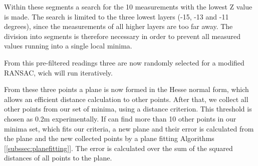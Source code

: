 \documentclass[11pt,oneside,openright]{mpreport}
\begin{document}



Within these segments a search for the 10 measurements with the lowest Z value is made. The search is limited to the three lowest layers (-15, -13 and -11 degrees),
since the measurements of all higher layers are too far away. The division into segments is therefore necessary in order to prevent all measured values running into a single local minima. 


From this pre-filtered readings three are now randomly selected for a modified \ac{RANSAC}, wich will run iteratively.

From these three points a plane is now formed in the Hesse normal form, which allows an efficient distance calculation to other points.
After that, we collect all other points from our set of minima, using a distance criterion. This threshold is chosen as 0.2m experimentally.
If can find more than 10 other points in our minima set, which fits our criteria, a new plane and their error is calculated from the plane and
the new collected points by a plane fitting Algorithms [\cref{subssec:planefitting}].
The error is calculated over the sum of the squared distances of all points to the plane.
\end{document}
